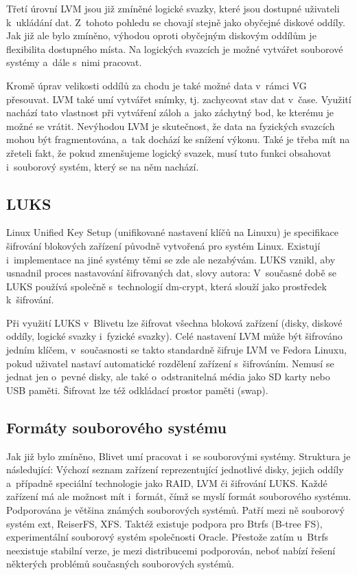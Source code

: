 \documentclass[printed,color,table,oneside,nolot,nolof]{fithesis}
\begin{document}
	Třetí úrovní LVM jsou již zmíněné logické svazky, které jsou dostupné uživateli k~ukládání dat. Z~tohoto pohledu se chovají stejně jako obyčejné diskové oddíly. Jak již ale
	bylo zmíněno, výhodou oproti obyčejným diskovým oddílům je flexibilita dostupného místa. Na logických svazcích je možné vytvářet souborové systémy a~dále s~nimi pracovat.

	Kromě úprav velikosti oddílů za chodu je také možné data v~rámci VG přesouvat. LVM také umí vytvářet snímky, tj. zachycovat stav dat v~čase. Využití nachází tato 
	vlastnost
	při vytváření záloh a~jako záchytný bod, ke kterému je možné se vrátit. Nevýhodou LVM je skutečnost, že data na fyzických svazcích mohou být fragmentována, a~tak
	dochází ke snížení výkonu. Také je třeba mít na zřeteli fakt, že pokud zmenšujeme logický svazek, musí tuto funkci obsahovat i~souborový systém, který se na něm nachází.

\subsection{LUKS}
	Linux Unified Key Setup (unifikované nastavení klíčů na Linuxu) je specifikace šifrování blokových zařízení původně vytvořená pro systém Linux. Existují i~implementace na jiné 
	systémy
	těmi se zde ale nezabývám. LUKS vznikl, aby usnadnil proces nastavování šifrovaných dat, slovy autora: \cite{on-disk-format} V~současné době se LUKS používá společně s~technologií dm-crypt, která slouží jako prostředek k~šifrování.

	Při využití LUKS v~Blivetu lze šifrovat všechna bloková zařízení (disky, diskové oddíly, logické svazky i~fyzické svazky). Celé nastavení LVM může být šifrováno jedním klíčem, v~současnosti se takto 
	standardně šifruje LVM ve Fedora Linuxu, pokud uživatel nastaví automatické rozdělení zařízení s~šifrováním. Nemusí se jednat jen o~pevné disky, ale také o~odstranitelná média jako
	SD karty nebo USB paměti. Šifrovat lze též odkládací prostor paměti (swap).

\subsection{Formáty souborového systému}
  Jak již bylo zmíněno, Blivet umí pracovat i~se souborovými systémy. Struktura je následující: Výchozí seznam zařízení reprezentující jednotlivé disky, jejich oddíly a~případně
	speciální technologie jako RAID, LVM či šifrování LUKS. Každé zařízení má ale možnost mít i~formát, čímž se myslí formát souborového systému. Podporována je většina známých 
	souborových
	systémů. Patří mezi ně souborový systém ext, ReiserFS, XFS. Taktéž existuje podpora pro Btrfs (B-tree FS)\cite{btrfs}, experimentální souborový systém 
	společnosti Oracle. Přestože zatím u~Btrfs neexistuje stabilní verze, je mezi distribucemi podporován, neboť nabízí řešení některých problémů současných souborových systémů.
\end{document}
